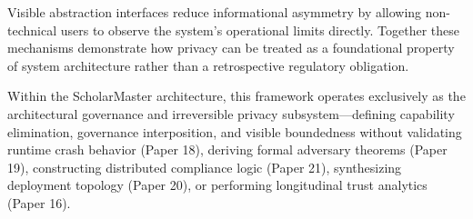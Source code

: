 \documentclass[conference]{IEEEtran}
\begin{document}
Visible abstraction interfaces reduce informational asymmetry by allowing non-technical users to observe the system's operational limits directly. Together these mechanisms demonstrate how privacy can be treated as a foundational property of system architecture rather than a retrospective regulatory obligation.

Within the ScholarMaster architecture, this framework operates exclusively as the architectural governance and irreversible privacy subsystem---defining capability elimination, governance interposition, and visible boundedness without validating runtime crash behavior (Paper 18), deriving formal adversary theorems (Paper 19), constructing distributed compliance logic (Paper 21), synthesizing deployment topology (Paper 20), or performing longitudinal trust analytics (Paper 16).
\end{document}
